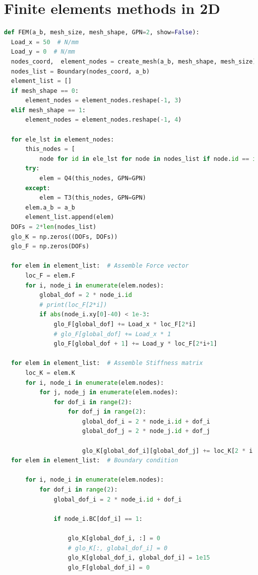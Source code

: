 \documentclass[twoside,twocolumn,10pt]{article}
\begin{document}
\section{Finite elements methods in 2D}
\label{Apdx:FEM_2D}
\begin{lstlisting}[language=Python, caption=Finite elements methods in 2D]
  def FEM(a_b, mesh_size, mesh_shape, GPN=2, show=False):
  Load_x = 50  # N/mm
  Load_y = 0  # N/mm
  nodes_coord,  element_nodes = create_mesh(a_b, mesh_shape, mesh_size)
  nodes_list = Boundary(nodes_coord, a_b)
  element_list = []
  if mesh_shape == 0:
      element_nodes = element_nodes.reshape(-1, 3)
  elif mesh_shape == 1:
      element_nodes = element_nodes.reshape(-1, 4)

  for ele_lst in element_nodes:
      this_nodes = [
          node for id in ele_lst for node in nodes_list if node.id == id]
      try:
          elem = Q4(this_nodes, GPN=GPN)
      except:
          elem = T3(this_nodes, GPN=GPN)
      elem.a_b = a_b
      element_list.append(elem)
  DOFs = 2*len(nodes_list)
  glo_K = np.zeros((DOFs, DOFs))
  glo_F = np.zeros(DOFs)

  for elem in element_list:  # Assemble Force vector
      loc_F = elem.F
      for i, node_i in enumerate(elem.nodes):
          global_dof = 2 * node_i.id
          # print(loc_F[2*i])
          if abs(node_i.xy[0]-40) < 1e-3:
              glo_F[global_dof] += Load_x * loc_F[2*i]
              # glo_F[global_dof] += Load_x * 1 
              glo_F[global_dof + 1] += Load_y * loc_F[2*i+1]

  for elem in element_list:  # Assemble Stiffness matrix
      loc_K = elem.K
      for i, node_i in enumerate(elem.nodes):
          for j, node_j in enumerate(elem.nodes):
              for dof_i in range(2):  
                  for dof_j in range(2):
                      global_dof_i = 2 * node_i.id + dof_i
                      global_dof_j = 2 * node_j.id + dof_j

                      glo_K[global_dof_i][global_dof_j] += loc_K[2 * i + dof_i][2*j + dof_j]
  for elem in element_list:  # Boundary condition

      for i, node_i in enumerate(elem.nodes):
          for dof_i in range(2):  
              global_dof_i = 2 * node_i.id + dof_i

              if node_i.BC[dof_i] == 1:

                  glo_K[global_dof_i, :] = 0
                  # glo_K[:, global_dof_i] = 0
                  glo_K[global_dof_i, global_dof_i] = 1e15  
                  glo_F[global_dof_i] = 0


\end{lstlisting}
\end{document}
